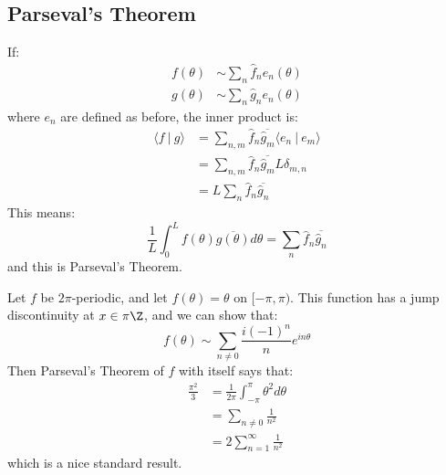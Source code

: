 \documentclass[../Main.tex]{subfiles}
\begin{document}
\subsection{Parseval's Theorem}
If:
\begin{align*}
    f(\theta) &\sim \sum_n \hat{f}_n e_n(\theta) \\
    g(\theta) &\sim \sum_n \hat{g}_n e_n(\theta)
\end{align*}
where $e_n$ are defined as before, the inner product is:
\begin{align*}
    \langle f~|~g\rangle &= \sum_{n, m} \hat{f}_n \overline{\hat{g}_m} \langle e_n~|~e_m\rangle \\
    &= \sum_{n, m} \hat{f}_n \overline{\hat{g}_m} L \delta_{m, n} \\
    &= L\sum_{n} \hat{f}_n \overline{\hat{g}_n}
\end{align*}    
This means:
\begin{equation}
    \frac{1}{L}\int_{0}^{L} f(\theta) \overline{g(\theta)} d\theta = \sum_{n} \hat{f}_n \overline{\hat{g}_n}
    \label{eqnParseval}
\end{equation}
and this is Parseval's Theorem.
\begin{example}
    Let $f$ be $2\pi$-periodic, and let $f(\theta) = \theta$ on $[-\pi, \pi)$. This function has a jump discontinuity at $x \in \pi \Z$, and we can show that:
    \begin{equation*}
        f(\theta) \sim \sum_{n \neq 0} \frac{i(-1)^n}{n}e^{in\theta}
    \end{equation*}
    Then Parseval's Theorem of $f$ with itself says that:
    \begin{align*}
        \frac{\pi^2}{3} &= \frac{1}{2\pi} \int_{-\pi}^{\pi} \theta^2 d\theta \\
        &= \sum_{n \neq 0} \frac{1}{n^2} \\
        &= 2\sum_{n = 1}^\infty \frac{1}{n^2}
    \end{align*}
    which is a nice standard result.
\end{example}
\end{document}
